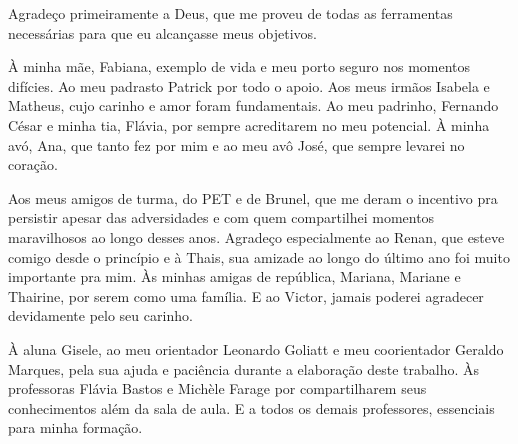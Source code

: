 \begin{agradecimentos}

Agradeço primeiramente a Deus, que me proveu de todas as ferramentas necessárias para que eu alcançasse meus objetivos.

À minha mãe, Fabiana, exemplo de vida e meu porto seguro nos momentos difícies. Ao meu padrasto Patrick por todo o apoio. Aos meus irmãos Isabela e Matheus, cujo carinho e amor foram fundamentais. Ao meu padrinho, Fernando César e minha tia, Flávia, por sempre acreditarem no meu potencial. À minha avó, Ana, que tanto fez por mim e ao meu avô José, que sempre levarei no coração.

Aos meus amigos de turma, do PET e de Brunel, que me deram o incentivo pra persistir apesar das adversidades e com quem compartilhei momentos maravilhosos ao longo desses anos. Agradeço especialmente ao Renan, que esteve comigo desde o princípio e à Thais, sua amizade ao longo do último ano foi muito importante pra mim. Às minhas amigas de república, Mariana, Mariane e Thairine, por serem como uma família. E ao Victor, jamais poderei agradecer devidamente pelo seu carinho. 

À aluna Gisele, ao meu orientador Leonardo Goliatt e meu coorientador Geraldo Marques, pela sua ajuda e paciência durante a elaboração deste trabalho. Às professoras Flávia Bastos e Michèle Farage por compartilharem seus conhecimentos além da sala de aula. E a todos os demais professores, essenciais para minha formação.

\end{agradecimentos}